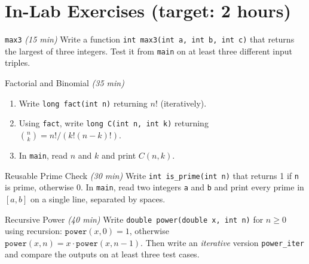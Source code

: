\documentclass[11pt]{article}
\begin{document}
\section*{In-Lab Exercises (target: 2 hours)}

\begin{labexercise}{\texttt{max3} \hfill {\small \itshape (15 min)}}
Write a function \texttt{int max3(int a, int b, int c)} that returns the largest of three integers.
Test it from \texttt{main} on at least three different input triples.
\end{labexercise}

\begin{labexercise}{Factorial and Binomial \hfill {\small \itshape (35 min)}}
\begin{enumerate}[nosep,leftmargin=*]
  \item Write \texttt{long fact(int n)} returning $n!$ (iteratively).
  \item Using \texttt{fact}, write \texttt{long C(int n, int k)} returning $\binom{n}{k} = n!/(k!(n-k)!)$.
  \item In \texttt{main}, read $n$ and $k$ and print $C(n,k)$.
\end{enumerate}
\end{labexercise}

\begin{labexercise}{Reusable Prime Check \hfill {\small \itshape (30 min)}}
Write \texttt{int is\_prime(int n)} that returns 1 if \texttt{n} is prime, otherwise 0.
In \texttt{main}, read two integers \texttt{a} and \texttt{b} and print every prime in $[a,b]$
on a single line, separated by spaces.
\end{labexercise}

\begin{labexercise}{Recursive Power \hfill {\small \itshape (40 min)}}
Write \texttt{double power(double x, int n)} for $n \geq 0$ using recursion:
$\texttt{power}(x, 0) = 1$, otherwise $\texttt{power}(x, n) = x \cdot \texttt{power}(x, n-1)$.
Then write an \emph{iterative} version \texttt{power\_iter} and compare the outputs on
at least three test cases.
\end{labexercise}
\end{document}
